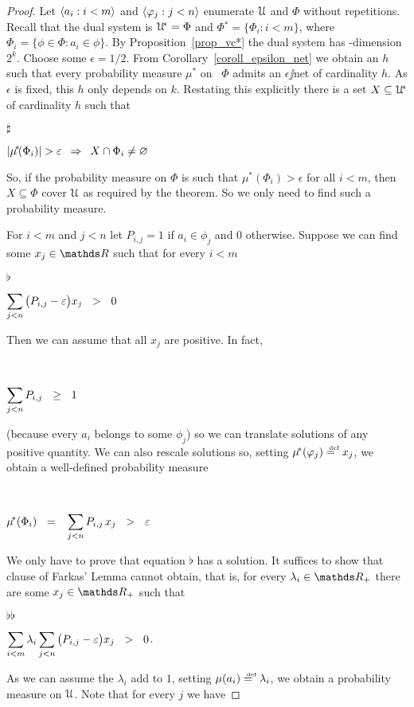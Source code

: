 \documentclass[sputnik.tex]{subfiles}
\begin{document}
\begin{proof}
Let $\langle a_i:i<m\rangle$ and $\langle\varphi_j:j<n\rangle$ enumerate $\EuScript U$ and $\Phi$ without repetitions.
Recall that the dual system is $\EuScript U\!^*=\Phi$ and $\Phi\!^{*}\!=\big\{\Phi_i: i<m\big\}$, where $\Phi_i=\big\{\phi\in\Phi: a_i\in\phi\big\}$.
By Proposition~\ref{prop_vc*} the dual system has \vc-dimension $2^k$.
Choose some $\epsilon=1/2$.
From Corollary~\ref{coroll_epsilon_net} we obtain an $h$ such that every probability measure $\mu\!^*$ on \ $\Phi$ admits an $\epsilon\jj$net of cardinality $h$.
As $\epsilon$ is fixed, this $h$ only depends on $k$.
Restating this explicitly there is a set $X\subseteq\EuScript U\!^*$ of cardinality $h$ such that

\parbox{10ex}{$\sharp$}
$\displaystyle\left|\mu\!^*\!(\Phi_i)\right|>\epsilon\medrel{\IMP}X\cap\Phi_i\neq\0$

So, if the probability measure on $\Phi$ is such that $\mu\!^*\!(\Phi_i)>\epsilon$ for all $i<m$, then $X\subseteq\Phi$ cover $\EuScript U$ as required by the theorem.
So we only need to find such a probability measure.

For $i<m$ and $j<n$ let $P_{i,j}=1$ if $a_i\in\phi_j$ and $0$ otherwise.
Suppose we can find some $x_j\in\RR$ such that for every $i<m$

\parbox{10ex}{$\flat$}
$\displaystyle\sum_{j<n}\big(P_{i,j}-\epsilon\big)x_j\medrel{>}0$

Then we can assume that all $x_j$ are positive.
In fact,

\parbox{10ex}{~}
$\displaystyle\sum_{j<n}P_{i,j}\medrel{\ge}1$

(because every $a_i$ belongs to some $\phi_j$) so we can translate solutions of any positive quantity.
We can also rescale solutions so, setting $\mu\!^*(\phi_j)\deq x_j$, we obtain a well-defined probability measure

\parbox{10ex}{~}
$\displaystyle\mu\!^*(\Phi_i)\medrel{=}\sum_{j<n}P_{i,j}\,x_j\medrel{>}\epsilon$

We only have to prove that equation $\flat$ has a solution.
It suffices to show that clause  of Farkas' Lemma cannot obtain, that is, for every $\lambda_i\in\RR_+$ there are some $x_j\in\RR_+$ such that

\parbox{10ex}{$\flat\flat$}
$\displaystyle\sum_{i<m}\lambda_i\sum_{j<n}\big(P_{i,j}-\epsilon\big)x_j\medrel{>}0$.

As we can assume the $\lambda_i$ add to $1$, setting $\mu(a_i)\deq\lambda_i$, we obtain a probability measure on $\EuScript U$.
Note that for every $j$ we have


\end{proof}
\end{document}
